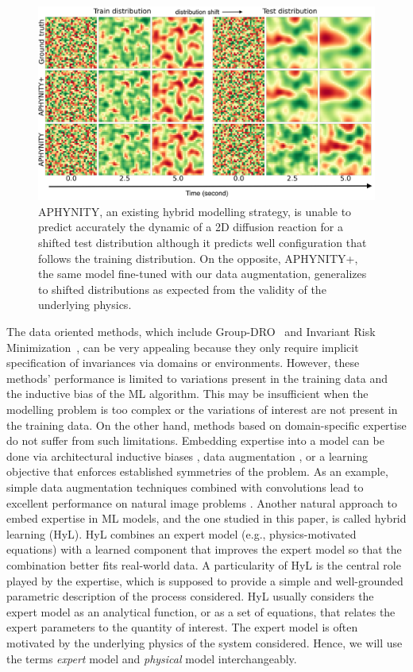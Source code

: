 \begin{figure}[t]
    \centering
    \vspace{-.5em}
    \includegraphics[width=.49\textwidth]{figures/chapter07/improved_diffusion.png}
    \vspace{-2.em}
    \caption{APHYNITY, an existing hybrid modelling strategy, is unable to predict accurately the dynamic of a 2D diffusion reaction for a shifted test distribution although it predicts well configuration that follows the training distribution. On the opposite, APHYNITY+, the same model fine-tuned with our data augmentation, generalizes to shifted distributions as expected from the validity of the underlying physics.}
    \label{fig:diffusion_shift}
    \vspace{-1em}
\end{figure}

The data oriented methods, which include Group-DRO~\citep{groupDRO_ICLR} and Invariant Risk Minimization~\citep[][IRM]{IRM}, can be very appealing because they only require implicit specification of invariances via domains or environments. However, these methods' performance is limited to variations present in the training data and the inductive bias of the ML algorithm. This may be insufficient when the modelling problem is too complex or the variations of interest are not present in the training data. On the other hand, methods based on domain-specific expertise do not suffer from such limitations. Embedding expertise into a model can be done via architectural inductive biases \citep{lecun_cnn, gnn}, data augmentation \citep{cubuk2019autoaugment}, or a learning objective \citep{lagrangian_nn} that enforces established symmetries of the problem. As an example, simple data augmentation techniques combined with convolutions lead to excellent performance on natural image problems \citep{cubuk2019autoaugment}. Another natural approach to embed expertise in ML models, and the one studied in this paper, is called hybrid learning (HyL). HyL combines an expert model (e.g., physics-motivated equations) with a learned component that improves the expert model so that the combination better fits real-world data. A particularity of HyL is the central role played by the expertise, which is supposed to provide a simple and well-grounded parametric description of the process considered. HyL usually considers the expert model as an analytical function, or as a set of equations, that relates the expert parameters to the quantity of interest. The expert model is often motivated by the underlying physics of the system considered. Hence, we will use the terms \textit{expert} model and \textit{physical} model interchangeably.

